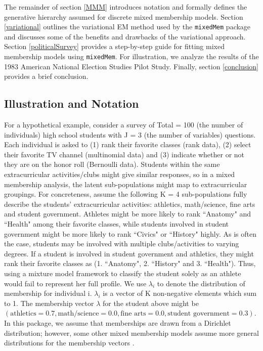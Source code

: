 \documentclass{article}
\begin{document}
The remainder of section \ref{MMM} introduces notation and formally defines the generative hierarchy assumed for discrete mixed membership models. Section \ref{variational} outlines the variational EM  method used by the \texttt{mixedMem} package and discusses some of the benefits and drawbacks of the variational approach. Section \ref{politicalSurvey} provides a step-by-step guide for fitting mixed membership models using \texttt{mixedMem}. For illustration, we analyze the results of the 1983 American National Election Studies Pilot Study. Finally, section \ref{conclusion} provides a brief conclusion.

\subsection{Illustration and Notation}
For a hypothetical example, consider a survey of Total =  100 (the number of individuals) high school students with J = 3 (the number of variables) questions. Each individual is asked to (1) rank their favorite classes (rank data), (2) select their favorite TV channel (multinomial data) and (3) indicate whether or not they are on the honor roll (Bernoulli data). Students within the same extracurricular activities/clubs might give similar responses, so in a mixed membership analysis, the latent sub-populations might map to extracurricular groupings. For concreteness, assume the following K = 4 sub-populations fully describe the students' extracurricular activities: athletics, math/science, fine arts and student government. Athletes might be more likely to rank ``Anatomy" and ``Health" among their favorite classes, while students involved in student government might be more likely to rank ``Civics" or ``History" highly.  As is often the case, students may be involved with multiple clubs/activities to varying degrees. If a student is involved in student government and athletics, they might rank their favorite classes as (1. ``Anatomy", 2. ``History" and 3. ``Health"). Thus, using a mixture model framework to classify the student solely as an athlete would fail to represent her full profile. We use $\lambda_i$ to denote the distribution of membership for individual i. $\lambda_i$ is a vector of K non-negative elements which sum to 1. The membership vector $\lambda$ for the student above might be $\left(\text{athletics} = 0.7, \text{math/science} = 0.0, \text{fine arts} = 0.0, \text{student government} = 0.3\right)$. In this package, we assume that memberships are drawn from a Dirichlet distribution; however, some other mixed membership models assume more general distributions for the membership vectors \citep{blei2006correlated}.
\end{document}
